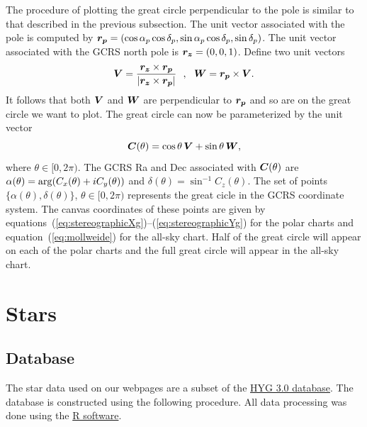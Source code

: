 \documentclass[12pt]{article}
\newcommand \beq {\begin{equation}}
\newcommand \eeq {\end{equation}}
\newcommand{\ve}[1]{\mbox{\boldmath $#1$}}
\begin{document}
The procedure of plotting the great circle perpendicular to the pole is similar 
to that described in the previous subsection. 
The unit vector associated with the pole is computed by 
$\ve{r_p} = (\cos \alpha_p \cos \delta_p, \sin \alpha_p \cos \delta_p, \sin \delta_p)$. 
The unit vector associated with the GCRS north pole is $\ve{r_z}=(0,0,1)$. 
Define two unit vectors 
\beq
  \ve{V} = \frac{\ve{r_z}\times \ve{r_p}}{|\ve{r_z}\times \ve{r_p}|} \ \ , \ \
  \ve{W} = \ve{r_p} \times \ve{V} .
\eeq
It follows that both $\ve{V}$ and $\ve{W}$ are perpendicular to $\ve{r_p}$ and so 
are on the great circle we want to plot. The great circle can now be parameterized 
by the unit vector 
\beq
  \ve{C}(\theta) = \cos \theta \, \ve{V} + \sin \theta \, \ve{W} ,
\eeq
where $\theta \in [0,2\pi)$. The GCRS Ra and Dec associated with $\ve{C}(\theta)$ are 
$\alpha(\theta) = {\rm arg}(C_x(\theta) + i C_y(\theta))$ and 
$\delta(\theta) = \sin^{-1} C_z(\theta)$. The set of points 
$\{ \alpha(\theta), \delta(\theta) \}$,
$\theta \in [0,2\pi)$ represents the great cicle in the GCRS coordinate
system. The canvas coordinates of these points are given by 
equations~(\ref{eq:stereographicXg})--(\ref{eq:stereographicYg}) for the polar charts and 
equation~(\ref{eq:mollweide}) for the all-sky chart. 
Half of the great circle will appear 
on each of the polar charts and the full great circle will appear  
in the all-sky chart. 

\section{Stars}

\subsection{Database}

The star data used on our webpages are a subset of the \href{http://astronexus.com/node/34}
{HYG 3.0 database}. The database is constructed using the following procedure. 
All data processing was done using the \href{https://www.r-project.org/}{R software}.
\end{document}
